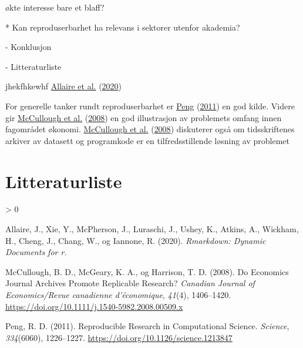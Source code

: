 \documentclass[
  12pt,
  norsk,
]{article}
\newlength{\cslhangindent}
\newenvironment{CSLReferences}[2] %
 {%
  \setlength{\parindent}{0pt}
  \ifodd #1 \everypar{\setlength{\hangindent}{\cslhangindent}}\ignorespaces\fi
  \ifnum #2 > 0
  \setlength{\parskip}{#2\baselineskip}
  \fi
 }%
 {}
\begin{document}
økte interesse bare et blaff?

* Kan reproduserbarhet ha relevans i sektorer utenfor akademia?

- Konklusjon

- Litteraturliste

jhekfhkewhf \protect\hyperlink{ref-allaire2020}{Allaire et al.}
(\protect\hyperlink{ref-allaire2020}{2020})

For generelle tanker rundt reproduserbarhet er
\protect\hyperlink{ref-peng2011}{Peng}
(\protect\hyperlink{ref-peng2011}{2011}) en god kilde. Videre gir
\protect\hyperlink{ref-mccullough2008}{McCullough et al.}
(\protect\hyperlink{ref-mccullough2008}{2008}) en god illustrasjon av
problemets omfang innen fagområdet økonomi.
\protect\hyperlink{ref-mccullough2008}{McCullough et al.}
(\protect\hyperlink{ref-mccullough2008}{2008}) diskuterer også om
tidsskriftenes arkiver av datasett og programkode er en
tilfredsstillende løsning av problemet

\hypertarget{litteraturliste}{%
\section{Litteraturliste}\label{litteraturliste}}

\hypertarget{refs}{}
\begin{CSLReferences}{1}{0}
\leavevmode\hypertarget{ref-allaire2020}{}%
Allaire, J., Xie, Y., McPherson, J., Luraschi, J., Ushey, K., Atkins,
A., Wickham, H., Cheng, J., Chang, W., og Iannone, R. (2020).
\emph{Rmarkdown: {Dynamic} Documents for r}.

\leavevmode\hypertarget{ref-mccullough2008}{}%
McCullough, B. D., McGeary, K. A., og Harrison, T. D. (2008). Do
Economics Journal Archives Promote Replicable Research? \emph{Canadian
Journal of Economics/Revue canadienne d'économique}, \emph{41}(4),
1406--1420. \url{https://doi.org/10.1111/j.1540-5982.2008.00509.x}

\leavevmode\hypertarget{ref-peng2011}{}%
Peng, R. D. (2011). Reproducible {Research} in {Computational Science}.
\emph{Science}, \emph{334}(6060), 1226--1227.
\url{https://doi.org/10.1126/science.1213847}

\end{CSLReferences}
\end{document}
